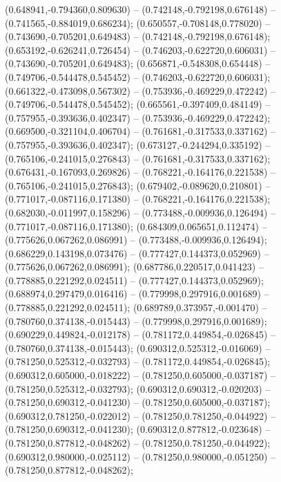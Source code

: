  (0.648941,-0.794360,0.809630) -- (0.742148,-0.792198,0.676148) -- (0.741565,-0.884019,0.686234);
 (0.650557,-0.708148,0.778020) -- (0.743690,-0.705201,0.649483) -- (0.742148,-0.792198,0.676148);
 (0.653192,-0.626241,0.726454) -- (0.746203,-0.622720,0.606031) -- (0.743690,-0.705201,0.649483);
 (0.656871,-0.548308,0.654448) -- (0.749706,-0.544478,0.545452) -- (0.746203,-0.622720,0.606031);
 (0.661322,-0.473098,0.567302) -- (0.753936,-0.469229,0.472242) -- (0.749706,-0.544478,0.545452);
 (0.665561,-0.397409,0.484149) -- (0.757955,-0.393636,0.402347) -- (0.753936,-0.469229,0.472242);
 (0.669500,-0.321104,0.406704) -- (0.761681,-0.317533,0.337162) -- (0.757955,-0.393636,0.402347);
 (0.673127,-0.244294,0.335192) -- (0.765106,-0.241015,0.276843) -- (0.761681,-0.317533,0.337162);
 (0.676431,-0.167093,0.269826) -- (0.768221,-0.164176,0.221538) -- (0.765106,-0.241015,0.276843);
 (0.679402,-0.089620,0.210801) -- (0.771017,-0.087116,0.171380) -- (0.768221,-0.164176,0.221538);
 (0.682030,-0.011997,0.158296) -- (0.773488,-0.009936,0.126494) -- (0.771017,-0.087116,0.171380);
 (0.684309,0.065651,0.112474) -- (0.775626,0.067262,0.086991) -- (0.773488,-0.009936,0.126494);
 (0.686229,0.143198,0.073476) -- (0.777427,0.144373,0.052969) -- (0.775626,0.067262,0.086991);
 (0.687786,0.220517,0.041423) -- (0.778885,0.221292,0.024511) -- (0.777427,0.144373,0.052969);
 (0.688974,0.297479,0.016416) -- (0.779998,0.297916,0.001689) -- (0.778885,0.221292,0.024511);
 (0.689789,0.373957,-0.001470) -- (0.780760,0.374138,-0.015443) -- (0.779998,0.297916,0.001689);
 (0.690229,0.449824,-0.012178) -- (0.781172,0.449854,-0.026845) -- (0.780760,0.374138,-0.015443);
 (0.690312,0.525312,-0.016069) -- (0.781250,0.525312,-0.032793) -- (0.781172,0.449854,-0.026845);
 (0.690312,0.605000,-0.018222) -- (0.781250,0.605000,-0.037187) -- (0.781250,0.525312,-0.032793);
 (0.690312,0.690312,-0.020203) -- (0.781250,0.690312,-0.041230) -- (0.781250,0.605000,-0.037187);
 (0.690312,0.781250,-0.022012) -- (0.781250,0.781250,-0.044922) -- (0.781250,0.690312,-0.041230);
 (0.690312,0.877812,-0.023648) -- (0.781250,0.877812,-0.048262) -- (0.781250,0.781250,-0.044922);
 (0.690312,0.980000,-0.025112) -- (0.781250,0.980000,-0.051250) -- (0.781250,0.877812,-0.048262);
